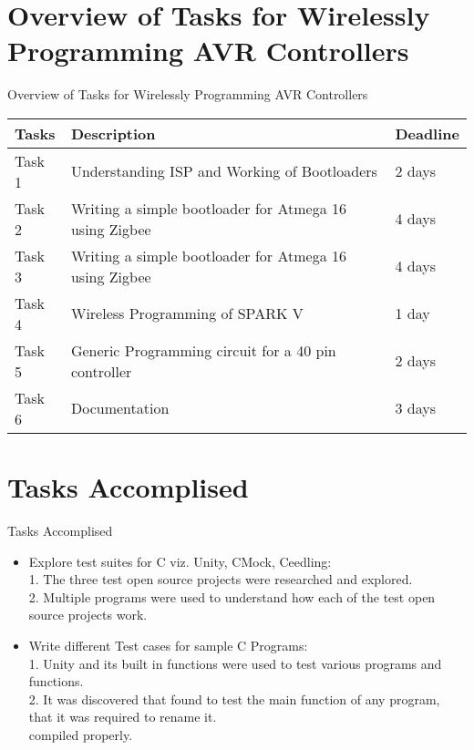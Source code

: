 \documentclass[10pt, a4paper]{beamer}
\begin{document}
\section{Overview of Tasks for Wirelessly Programming AVR Controllers}
\begin{frame}{Overview of Tasks for Wirelessly Programming AVR Controllers}
	\begin{center}
	\begin{tabular}{ |p{2cm}|p{5cm}|p{1.5cm}| }
	\hline
 	 Tasks & Description & Deadline \\
	\hline
 	 Task 1 & Understanding ISP and Working of Bootloaders & 2 days \\ 
	\hline
	 Task 2 & Writing a simple bootloader for Atmega 16 using Zigbee & 4 days \\ 
	\hline
	 Task 3 & Writing a simple bootloader for Atmega 16 using Zigbee & 4 days \\ 
	\hline
	 Task 4 & Wireless Programming of SPARK V & 1 day \\ 
	\hline
	 Task 5 & Generic Programming circuit for a 40 pin controller & 2 days \\ 
	 \hline
	 Task 6 & Documentation & 3 days \\ 
	\hline
	\end{tabular}
	\end{center}
\end{frame}


\section{Tasks Accomplised}
\begin{frame}{Tasks Accomplised}
	\begin{itemize}
	  \item Explore test suites for C viz. Unity, CMock, Ceedling:\\
	  \hspace{.1cm} 1. The three test open source projects were researched and explored. \\
          \hspace{.1cm} 2. Multiple programs were used to understand how each of the test open source projects work. \\
	  \item Write different Test cases for sample C Programs:\\
	  \hspace{.1cm} 1. Unity and its built in functions were used to test various programs and functions. \\
          \hspace{.1cm} 2. It was discovered that found to test the main function of any program, that it was required to rename it. \\
 compiled properly. \\
	\end{itemize}
\end{frame}
\end{document}
